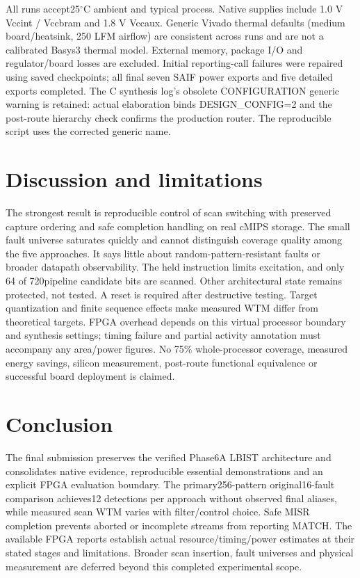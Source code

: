 \documentclass[11pt,a4paper]{article}
\begin{document}
All runs accept25$^\circ$C ambient and typical process. Native supplies include 1.0 V Vccint / Vccbram and 1.8 V Vccaux. Generic Vivado thermal defaults (medium board/heatsink, 250 LFM airflow) are consistent across runs and are not a calibrated Basys3 thermal model. External memory, package I/O and regulator/board losses are excluded. Initial reporting-call failures were repaired using saved checkpoints; all final seven SAIF power exports and five detailed exports completed. The C synthesis log's obsolete CONFIGURATION generic warning is retained: actual elaboration binds DESIGN\_CONFIG=2 and the post-route hierarchy check confirms the production router. The reproducible script uses the corrected generic name.



\section{Discussion and limitations}


The strongest result is reproducible control of scan switching with preserved capture ordering and safe completion handling on real cMIPS storage. The small fault universe saturates quickly and cannot distinguish coverage quality among the five approaches. It says little about random-pattern-resistant faults or broader datapath observability. The held instruction limits excitation, and only 64 of 720pipeline candidate bits are scanned. Other architectural state remains protected, not tested. A reset is required after destructive testing. Target quantization and finite sequence effects make measured WTM differ from theoretical targets. FPGA overhead depends on this virtual processor boundary and synthesis settings; timing failure and partial activity annotation must accompany any area/power figures. No 75\% whole-processor coverage, measured energy savings, silicon measurement, post-route functional equivalence or successful board deployment is claimed.



\section{Conclusion}


The final submission preserves the verified Phase6A LBIST architecture and consolidates native evidence, reproducible essential demonstrations and an explicit FPGA evaluation boundary. The primary256-pattern original16-fault comparison achieves12 detections per approach without observed final aliases, while measured scan WTM varies with filter/control choice. Safe MISR completion prevents aborted or incomplete streams from reporting MATCH. The available FPGA reports establish actual resource/timing/power estimates at their stated stages and limitations. Broader scan insertion, fault universes and physical measurement are deferred beyond this completed experimental scope.
\end{document}
